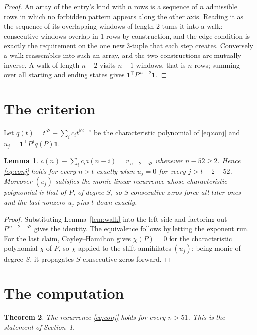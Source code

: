\documentclass[11pt,a4paper]{article}
\theoremstyle{plain}
\newtheorem{theorem}{Theorem}
\newtheorem{lemma}[theorem]{Lemma}
\theoremstyle{definition}
\begin{document}
\begin{proof}
An array of the entry's kind with $n$ rows is a sequence of $n$ admissible rows in
which no forbidden pattern appears along the other axis. Reading it as the sequence of its
overlapping windows of length $2$ turns it into a walk: consecutive windows overlap in
$1$ rows by construction, and the edge condition is exactly the requirement on the one
new $3$-tuple that each step creates. Conversely a walk reassembles into such an array,
and the two constructions are mutually inverse. A walk of length $n-2$ visits $n-1$
windows, that is $n$ rows; summing over all starting and ending states gives
$\mathbf{1}^{\!\top}P^{\,n-2}\mathbf{1}$.
\end{proof}

\section{The criterion}

Let $q(t)=t^{52}-\sum_i c_i t^{52-i}$ be the characteristic polynomial of
\eqref{eq:conj} and $u_j=\mathbf{1}^{\!\top}P^{j}q(P)\mathbf{1}$.

\begin{lemma}\label{lem:crit}
$a(n)-\sum_i c_i a(n-i)=u_{\,n-2-52}$ whenever $n-52\ge2$. Hence
\eqref{eq:conj} holds for every $n>t$ exactly when $u_j=0$ for every
$j>t-2-52$. Moreover $(u_j)$ satisfies the monic linear recurrence whose
characteristic polynomial is that of $P$, of degree $S$, so $S$ consecutive zeros force all
later ones and the last nonzero $u_j$ pins $t$ down exactly.
\end{lemma}

\begin{proof}
Substituting Lemma~\ref{lem:walk} into the left side and factoring out
$P^{\,n-2-52}$ gives the identity. The equivalence follows by letting the exponent
run. For the last claim, Cayley--Hamilton gives $\chi(P)=0$ for the characteristic
polynomial $\chi$ of $P$, so $\chi$ applied to the shift annihilates $(u_j)$; being monic of
degree $S$, it propagates $S$ consecutive zeros forward.
\end{proof}

\section{The computation}

\begin{theorem}
The recurrence \eqref{eq:conj} holds for every $n>51$. This is the statement of
Section~1.
\end{theorem}
\end{document}
